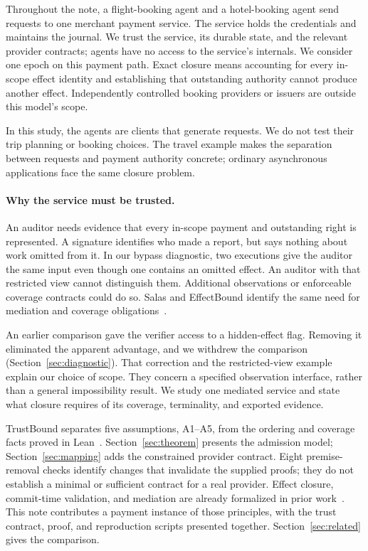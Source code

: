 \documentclass[letterpaper]{article}
\begin{document}
Throughout the note, a flight-booking agent and a hotel-booking agent send
requests to one merchant payment service. The service holds the credentials
and maintains the journal. We trust the service, its durable state, and the
relevant provider contracts; agents have no access to the service's internals.
We consider one epoch on this payment path. Exact closure means accounting for
every in-scope effect identity and establishing that outstanding authority
cannot produce another effect. Independently controlled booking providers or
issuers are outside this model's scope.

In this study, the agents are clients that generate requests. We do not test
their trip planning or booking choices. The travel example makes the separation
between requests and payment authority concrete; ordinary asynchronous
applications face the same closure problem.

\paragraph{Why the service must be trusted.}
An auditor needs evidence that every in-scope payment and outstanding right is
represented. A signature identifies who made a report, but says nothing about
work omitted from it. In our bypass diagnostic, two executions give the auditor
the same input even though one contains an omitted effect. An auditor with
that restricted view cannot distinguish them. Additional observations or
enforceable coverage contracts could do so. Salas and EffectBound identify the
same need for mediation and coverage obligations~\citep{salas,effectbound}.

An earlier comparison gave the verifier access to a hidden-effect flag.
Removing it eliminated the apparent advantage, and we withdrew the comparison
(Section~\ref{sec:diagnostic}). That correction and the restricted-view example
explain our choice of scope. They concern a specified observation interface,
rather than a general impossibility result. We study one mediated service and
state what closure requires of its coverage, terminality, and exported evidence.

TrustBound separates five assumptions, A1--A5, from the ordering and coverage
facts proved in Lean~\citep{lean42021}. Section~\ref{sec:theorem} presents the
admission model; Section~\ref{sec:mapping} adds the constrained provider contract.
Eight premise-removal checks identify changes that invalidate the supplied
proofs; they do not establish a minimal or sufficient contract for a real
provider. Effect closure, commit-time validation, and mediation are already
formalized in prior work~\citep{effectbound,cta,salas}. This note contributes a
payment instance of those principles, with the trust contract, proof, and
reproduction scripts presented together. Section~\ref{sec:related} gives the
comparison.
\end{document}
